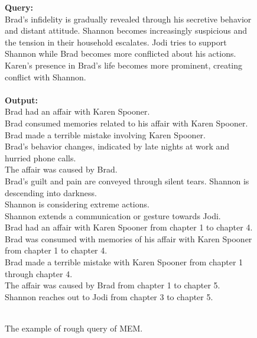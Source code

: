 \begin{figure}[htbp]
\centering
\begin{tcolorbox}
\textbf{Query:}\\
Brad's infidelity is gradually revealed through his secretive behavior and distant attitude. Shannon becomes increasingly suspicious and the tension in their household escalates. Jodi tries to support Shannon while Brad becomes more conflicted about his actions. Karen's presence in Brad's life becomes more prominent, creating conflict with Shannon.\\
\\
\textbf{Output:}\\
Brad had an affair with Karen Spooner.\\
Brad consumed memories related to his affair with Karen Spooner.\\
Brad made a terrible mistake involving Karen Spooner.\\
Brad's behavior changes, indicated by late nights at work and hurried phone calls.\\
The affair was caused by Brad.\\
Brad's guilt and pain are conveyed through silent tears.
Shannon is descending into darkness.\\
Shannon is considering extreme actions.\\
Shannon extends a communication or gesture towards Jodi.\\
Brad had an affair with Karen Spooner from chapter 1 to chapter 4.\\
Brad was consumed with memories of his affair with Karen Spooner from chapter 1 to chapter 4.\\
Brad made a terrible mistake with Karen Spooner from chapter 1 through chapter 4.\\
The affair was caused by Brad from chapter 1 to chapter 5.\\
Shannon reaches out to Jodi from chapter 3 to chapter 5.\\
\\
\end{tcolorbox}
\caption{The example of rough query of MEM.}
\label{tab:rough_query}
\end{figure}

